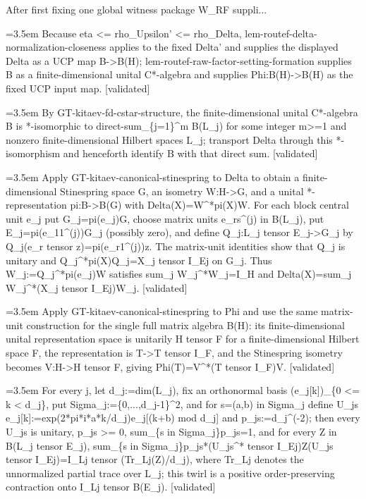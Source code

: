 \documentclass{article}
\newcommand{\step}[1]{\par\noindent\hangindent=3.5em\hangafter=1%
  \makebox[3.5em][l]{\textbf{#1.}}}
\newcommand{\steptag}[1]{\hfill{\small\textsf{[#1]}}}
\begin{document}
\begin{proofbox}{After first fixing one global witness package W\_RF suppli...}
\step{1.1.1} Because eta <= rho\_Upsilon' <= rho\_Delta, lem-routef-delta-normalization-closeness applies to the fixed Delta' and supplies the displayed Delta as a UCP map B->B(H); lem-routef-raw-factor-setting-formation supplies B as a finite-dimensional unital C*-algebra and supplies Phi:B(H)->B(H) as the fixed UCP input map. \steptag{validated} \\[4pt]
\step{1.1.2} By GT-kitaev-fd-cstar-structure, the finite-dimensional unital C*-algebra B is *-isomorphic to direct-sum\_\{j=1\}\textasciicircum{}m B(L\_j) for some integer m>=1 and nonzero finite-dimensional Hilbert spaces L\_j; transport Delta through this *-isomorphism and henceforth identify B with that direct sum. \steptag{validated} \\[4pt]
\step{1.1.3} Apply GT-kitaev-canonical-stinespring to Delta to obtain a finite-dimensional Stinespring space G, an isometry W:H->G, and a unital *-representation pi:B->B(G) with Delta(X)=W\textasciicircum{}*pi(X)W. For each block central unit e\_j put G\_j=pi(e\_j)G, choose matrix units e\_rs\textasciicircum{}(j) in B(L\_j), put E\_j=pi(e\_11\textasciicircum{}(j))G\_j (possibly zero), and define Q\_j:L\_j tensor E\_j->G\_j by Q\_j(e\_r tensor z)=pi(e\_r1\textasciicircum{}(j))z. The matrix-unit identities show that Q\_j is unitary and Q\_j\textasciicircum{}*pi(X)Q\_j=X\_j tensor I\_Ej on G\_j. Thus W\_j:=Q\_j\textasciicircum{}*pi(e\_j)W satisfies sum\_j W\_j\textasciicircum{}*W\_j=I\_H and Delta(X)=sum\_j W\_j\textasciicircum{}*(X\_j tensor I\_Ej)W\_j. \steptag{validated} \\[4pt]
\step{1.1.4} Apply GT-kitaev-canonical-stinespring to Phi and use the same matrix-unit construction for the single full matrix algebra B(H): its finite-dimensional unital representation space is unitarily H tensor F for a finite-dimensional Hilbert space F, the representation is T->T tensor I\_F, and the Stinespring isometry becomes V:H->H tensor F, giving Phi(T)=V\textasciicircum{}*(T tensor I\_F)V. \steptag{validated} \\[4pt]
\step{1.2} For every j, let d\_j:=dim(L\_j), fix an orthonormal basis (e\_j[k])\_\{0 <= k < d\_j\}, put Sigma\_j:=\{0,...,d\_j-1\}\textasciicircum{}2, and for s=(a,b) in Sigma\_j define U\_js e\_j[k]:=exp(2*pi*i*a*k/d\_j)e\_j[(k+b) mod d\_j] and p\_js:=d\_j\textasciicircum{}(-2); then every U\_js is unitary, p\_js >= 0, sum\_\{s in Sigma\_j\}p\_js=1, and for every Z in B(L\_j tensor E\_j), sum\_\{s in Sigma\_j\}p\_js*(U\_js\textasciicircum{}* tensor I\_Ej)Z(U\_js tensor I\_Ej)=I\_Lj tensor (Tr\_Lj(Z)/d\_j), where Tr\_Lj denotes the unnormalized partial trace over L\_j; this twirl is a positive order-preserving contraction onto I\_Lj tensor B(E\_j). \steptag{validated} \\[6pt]

\end{proofbox}
\end{document}
